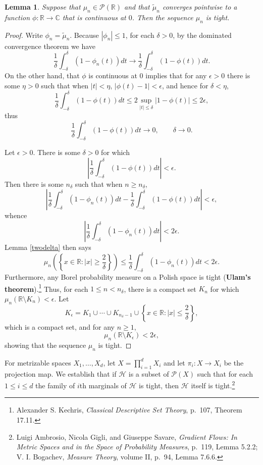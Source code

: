 \documentclass{article}
\newtheorem{lemma}[theorem]{Lemma}
\theoremstyle{definition}
\begin{document}
\begin{lemma}
Suppose that $\mu_n \in \mathscr{P}(\mathbb{R})$ and that 
$\tilde{\mu}_n$ converges pointwise to a function $\phi:\mathbb{R} \to \mathbb{C}$ 
that is continuous at $0$. Then the sequence $\mu_n$ is tight.
\label{1dtight}
\end{lemma}
\begin{proof}
Write $\phi_n=\tilde{\mu}_n$.
Because $|\phi_n| \leq 1$, for each $\delta>0$, by the dominated convergence theorem we have
\[
\frac{1}{\delta} \int_{-\delta}^\delta (1-\phi_n(t)) dt \to
\frac{1}{\delta} \int_{-\delta}^\delta (1-\phi(t)) dt.
\]
On the other hand, that $\phi$ is continuous at $0$ implies that for any $\epsilon>0$ there is some
$\eta>0$ such that when $|t|<\eta$, $|\phi(t)-1|<\epsilon$, and hence for $\delta<\eta$,
\[
\frac{1}{\delta} \int_{-\delta}^\delta (1-\phi(t)) dt
\leq 2\sup_{|t| \leq \delta} |1-\phi(t)|
\leq 2\epsilon,
\]
thus
\[
\frac{1}{\delta} \int_{-\delta}^\delta (1-\phi(t)) dt \to 0, \qquad \delta \to 0.
\]

Let $\epsilon>0$. There is some 
$\delta>0$ for which
\[
\left|\frac{1}{\delta} \int_{-\delta}^\delta (1-\phi(t)) dt \right| < \epsilon.
\]
Then there is some $n_\delta$ such that when $n \geq n_\delta$,
\[
\left| \frac{1}{\delta}\int_{-\delta}^\delta (1-\phi_n(t)) dt - \frac{1}{\delta} \int_{-\delta}^\delta (1-\phi(t)) dt\right|
<\epsilon,
\]
whence
\[
\left| \frac{1}{\delta}\int_{-\delta}^\delta (1-\phi_n(t)) dt \right| < 2\epsilon.
\]
Lemma \ref{twodelta} then says
\[
\mu_n\left( \left\{ x \in \mathbb{R}: |x| \geq \frac{2}{\delta} \right\} \right)
\leq \frac{1}{\delta} \int_{-\delta}^\delta (1-\phi_n(t)) dt
<2\epsilon. 
\]
Furthermore, any Borel probability measure on a Polish space is tight (\textbf{Ulam's theorem}).\footnote{Alexander S. Kechris,
{\em Classical Descriptive Set Theory}, p.~107, Theorem 17.11.}
Thus, for each $1 \leq n < n_\delta$, there is a compact set $K_n$ for which 
$\mu_n(\mathbb{R} \setminus K_n)<\epsilon$. 
Let 
\[
K_\epsilon = K_1 \cup \cdots \cup K_{n_\delta-1} \cup \left\{x \in \mathbb{R}: |x| \leq \frac{2}{\delta}\right\},
\]
which is a compact set, and for any $n \geq 1$,
\[
\mu_n(\mathbb{R} \setminus K_\epsilon)<2\epsilon,
\]
showing that the sequence $\mu_n$ is tight.
\end{proof}



For  metrizable spaces $X_1,\ldots,X_d$, let
$X = \prod_{i=1}^d X_i$ and let $\pi_i:X \to X_i$ be the projection map. 
We  establish that if $\mathscr{H}$
is a subset of $\mathscr{P}(X)$ such that for each $1 \leq i \leq d$ the family
of $i$th marginals of $\mathscr{H}$ is tight, then $\mathscr{H}$ itself is tight.\footnote{Luigi Ambrosio, Nicola Gigli, and Giuseppe Savare,
{\em Gradient Flows: In Metric Spaces and in the Space of Probability Measures},
p.~119, Lemma 5.2.2;
V. I. Bogachev, {\em Measure Theory}, volume II, p.~94, Lemma 7.6.6.}
\end{document}
